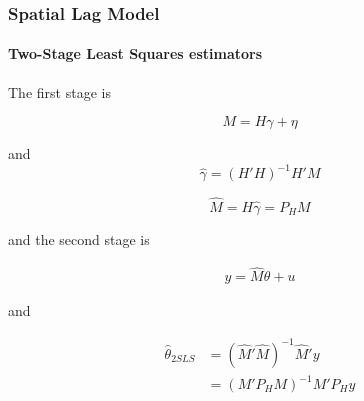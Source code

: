 \documentclass[
  shownotes,
  xcolor={svgnames},
  hyperref={colorlinks,citecolor=DarkBlue,linkcolor=DarkRed,urlcolor=DarkBlue}
  ]{beamer}
\begin{document}
\begin{frame}[fragile]
\frametitle{Spatial Lag Model}
\framesubtitle{Two-Stage Least Squares estimators}


The first stage is

\[
M=H\gamma+\eta
\]

and 
\[
\hat{\gamma}=(H'H)^{-1}H'M
\]


\[
\hat{M}=H\hat{\gamma}=P_{H}M
\]

and the second stage is 

\begin{align}
y=\hat{M}\theta+u
\end{align}

and 

\begin{align}
\hat{\theta}_{2SLS}&=(\hat{M}'\hat{M})^{-1}\hat{M}'y \nonumber \\
&=(M'P_{H}M)^{-1}M'P_{H}y
\end{align}



\end{frame}
\end{document}

